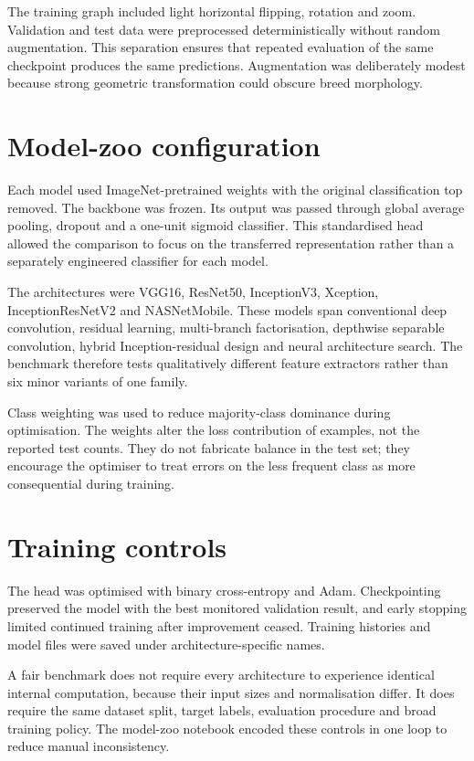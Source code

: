 The training graph included light horizontal flipping, rotation and zoom. Validation and test data were preprocessed deterministically without random augmentation. This separation ensures that repeated evaluation of the same checkpoint produces the same predictions. Augmentation was deliberately modest because strong geometric transformation could obscure breed morphology.

\section{Model-zoo configuration}
Each model used ImageNet-pretrained weights with the original classification top removed. The backbone was frozen. Its output was passed through global average pooling, dropout and a one-unit sigmoid classifier. This standardised head allowed the comparison to focus on the transferred representation rather than a separately engineered classifier for each model.

The architectures were VGG16, ResNet50, InceptionV3, Xception, InceptionResNetV2 and NASNetMobile. These models span conventional deep convolution, residual learning, multi-branch factorisation, depthwise separable convolution, hybrid Inception-residual design and neural architecture search. The benchmark therefore tests qualitatively different feature extractors rather than six minor variants of one family.

Class weighting was used to reduce majority-class dominance during optimisation. The weights alter the loss contribution of examples, not the reported test counts. They do not fabricate balance in the test set; they encourage the optimiser to treat errors on the less frequent class as more consequential during training.

\section{Training controls}
The head was optimised with binary cross-entropy and Adam. Checkpointing preserved the model with the best monitored validation result, and early stopping limited continued training after improvement ceased. Training histories and model files were saved under architecture-specific names.

A fair benchmark does not require every architecture to experience identical internal computation, because their input sizes and normalisation differ. It does require the same dataset split, target labels, evaluation procedure and broad training policy. The model-zoo notebook encoded these controls in one loop to reduce manual inconsistency.

